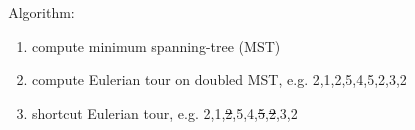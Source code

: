 \documentclass{beamer} %
\newcommand{\backupend}{
   \addtocounter{framenumberappendix}{-\value{framenumber}}
   \addtocounter{framenumber}{\value{framenumberappendix}} 
}
\begin{document}
\begin{frame}
\begin{columns}[T]
\begin{column}{.35\textwidth}
\begin{figure}
\begin{overprint}
          \begin{center}\end{center}
        \end{overprint}
      \end{figure}
    \end{column}%
    \hfill%
    \begin{column}{.65\textwidth}
      \begin{minipage}[c][.6\textheight][c]{\linewidth}
        Algorithm:
        \begin{enumerate}
          \item<2-> compute { minimum spanning-tree (MST)}
          \item<3-> compute Eulerian tour on { doubled MST}, e.g. 2,1,2,5,4,5,2,3,2
          \item<4-> shortcut Eulerian tour, e.g. 2,1,\sout{2},5,4,\sout{5},\sout{2},3,2
        \end{enumerate}
      \end{minipage}
    \end{column}%
  \end{columns}
\end{frame}

\backupend
\end{document}
